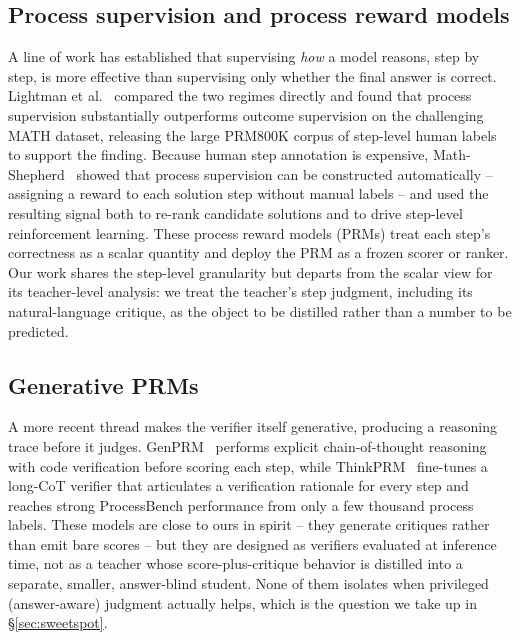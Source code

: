 \documentclass[11pt]{article}
\begin{document}
\subsection{Process supervision and process reward models}
A line of work has established that supervising \emph{how} a model reasons,
step by step, is more effective than supervising only whether the final
answer is correct. Lightman et al.~\cite{lightman2023verify} compared the two
regimes directly and found that process supervision substantially
outperforms outcome supervision on the challenging MATH dataset, releasing
the large PRM800K corpus of step-level human labels to support the finding.
Because human step annotation is expensive, Math-Shepherd~\cite{wang2023mathshepherd}
showed that process supervision can be constructed automatically -- assigning
a reward to each solution step without manual labels -- and used the
resulting signal both to re-rank candidate solutions and to drive step-level
reinforcement learning. These process reward models (PRMs) treat each step's
correctness as a scalar quantity and deploy the PRM as a frozen scorer or
ranker. Our work shares the step-level granularity but departs from the
scalar view for its teacher-level analysis: we treat the teacher's step
judgment, including its natural-language critique, as the object to be
distilled rather than a number to be predicted.

\subsection{Generative PRMs}
A more recent thread makes the verifier itself generative, producing a
reasoning trace before it judges. GenPRM~\cite{zhao2025genprm} performs
explicit chain-of-thought reasoning with code verification before scoring
each step, while ThinkPRM~\cite{khalifa2025thinkprm} fine-tunes a long-CoT
verifier that articulates a verification rationale for every step and
reaches strong ProcessBench performance from only a few thousand process
labels. These models are close to ours in spirit -- they generate critiques
rather than emit bare scores -- but they are designed as verifiers evaluated
at inference time, not as a teacher whose score-plus-critique behavior is
distilled into a separate, smaller, answer-blind student. None of them
isolates when privileged (answer-aware) judgment actually helps, which is
the question we take up in \S\ref{sec:sweetspot}.
\end{document}
